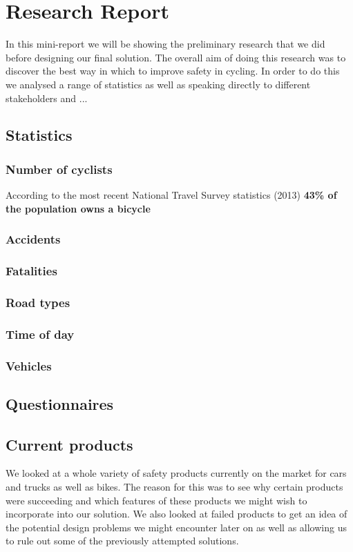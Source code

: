 \documentclass[a4paper]{report}
\begin{document}
\chapter{Research Report}
In this mini-report we will be showing the preliminary research that we did before designing our final solution. The overall aim of doing this research was to discover the best way in which to improve safety in cycling. In order to do this we analysed a range of statistics as well as speaking directly to different stakeholders and ...
\newpage
\section{Statistics}
\subsection{Number of cyclists}
According to the most recent National Travel Survey statistics (2013) \textbf{43\% of the population owns a bicycle} 
\subsection{Accidents}
\subsection{Fatalities}
\subsection{Road types}
\subsection{Time of day}
\subsection{Vehicles}
\newpage
\section{Questionnaires}
\newpage
\section{Current products}
We looked at a whole variety of safety products currently on the market for cars and trucks as well as bikes. The reason for this was to see why certain products were succeeding and which features of these products we might wish to incorporate into our solution. We also looked at failed products to get an idea of the potential design problems we might encounter later on as well as allowing us to rule out some of the previously attempted solutions.
\end{document}
